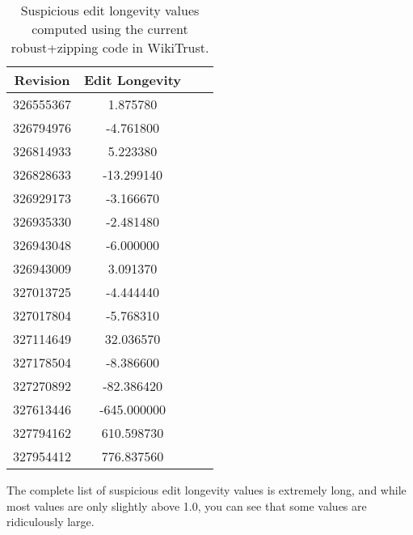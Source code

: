 \begin{table}[htbp]
\begin{center}
    \begin{tabular}{|c|c|c|c|}
    \hline
    Revision & Edit Longevity \\
    \hline
    326555367 & 1.875780 \\
    326794976 & -4.761800 \\
    326814933 & 5.223380 \\
    326828633 & -13.299140 \\
    326929173 & -3.166670 \\
    326935330 & -2.481480 \\
    326943048 & -6.000000 \\
    326943009 & 3.091370 \\
    327013725 & -4.444440 \\
    327017804 & -5.768310 \\
    327114649 & 32.036570 \\
    327178504 & -8.386600 \\
    327270892 & -82.386420 \\
    327613446 & -645.000000 \\
    327794162 & 610.598730 \\
    327954412 & 776.837560 \\
    \hline
    \end{tabular}
\end{center}
\caption{Suspicious edit longevity values computed using the
    current robust+zipping code in WikiTrust.}
\label{table:badeditlong}
\end{table}

The complete list of suspicious edit longevity values is extremely
long, and while most values are only slightly above 1.0, you can
see that some values are ridiculously large.

